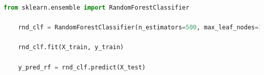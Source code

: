 \begin{lstlisting}[style=mystylepython, language=Python, caption=bosque aleatorio con 500 árboles]
    from sklearn.ensemble import RandomForestClassifier

    rnd_clf = RandomForestClassifier(n_estimators=500, max_leaf_nodes=16, n_jobs=-1, random_state=42)

    rnd_clf.fit(X_train, y_train)

    y_pred_rf = rnd_clf.predict(X_test)    
\end{lstlisting}